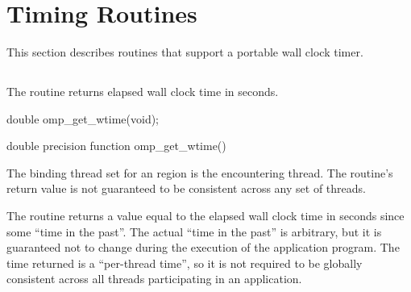 \section{Timing Routines}
\label{sec:Timing Routines}
This section describes routines that support a portable wall clock timer.











\subsection{}
\label{subsec:omp_get_wtime}
\summary
The  routine returns elapsed wall clock time in seconds.

\format
\begin{ccppspecific}
\begin{ompcFunction}
double omp_get_wtime(void);
\end{ompcFunction}
\end{ccppspecific}

\begin{fortranspecific}
\begin{ompfFunction}
double precision function omp_get_wtime()
\end{ompfFunction}
\end{fortranspecific}

\binding
The binding thread set for an  region is the encountering thread. The
routine's return value is not guaranteed to be consistent across any set of threads.

\effect
The  routine returns a value equal to the elapsed wall clock time in
seconds since some ``time in the past''. The actual ``time in the past'' is arbitrary, but it is
guaranteed not to change during the execution of the application program. The time
returned is a ``per-thread time'', so it is not required to be globally consistent across all
threads participating in an application.

